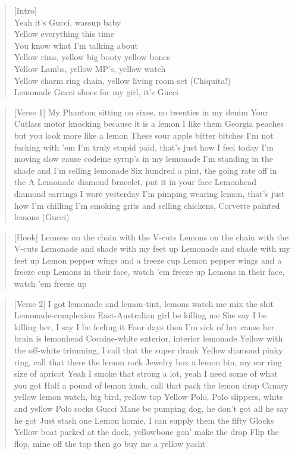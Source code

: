 \documentclass{book}
\begin{document}
\begin{verse}
{[}Intro]\\
Yeah it’s Gucci, wassup baby\\
Yellow everything this time\\
You know what I’m talking about\\
Yellow rims, yellow big booty yellow bones\\
Yellow Lambs, yellow MP's, yellow watch\\
Yellow charm ring chain, yellow living room set (Chiquita!)\\
Lemonade Gucci shoes for my girl, it’s Gucci\\
\end{verse}
\begin{verse}
{[}Verse 1]
My Phantom sitting on sixes, no twenties in my denim
Your Cutlass motor knocking because it is a lemon
I like them Georgia peaches but you look more like a lemon
These sour apple bitter bitches I'm not fucking with 'em
I'm truly stupid paid, that's just how I feel today
I'm moving slow cause codeine syrup's in my lemonade
I'm standing in the shade and I'm selling lemonade
Six hundred a pint, the going rate off in the A
Lemonade diamond bracelet, put it in your face
Lemonhead diamond earrings I wore yesterday
I'm pimping wearing lemon, that's just how I'm chilling
I'm smoking grits and selling chickens, Corvette painted lemons (Gucci)
\end{verse}
\begin{verse}
{[}Hook]
Lemons on the chain with the V-cuts
Lemons on the chain with the V-cuts
Lemonade and shade with my feet up
Lemonade and shade with my feet up
Lemon pepper wings and a freeze cup
Lemon pepper wings and a freeze cup
Lemons in their face, watch 'em freeze up
Lemons in their face, watch 'em freeze up
\end{verse}
\begin{verse}
{[}Verse 2]
I got lemonade and lemon-tint, lemons watch me mix the shit
Lemonade-complexion East-Australian girl be killing me
She say I be killing her, I say I be feeling it
Four days then I'm sick of her cause her brain is lemonhead
Cocaine-white exterior, interior lemonade
Yellow with the off-white trimming, I call that the super drank
Yellow diamond pinky ring, call that there the lemon rock
Jewelry box a lemon bin, my ear ring size of apricot
Yeah I smoke that strong a lot, yeah I need some of what you got
Half a pound of lemon kush, call that pack the lemon drop
Canary yellow lemon watch, big bird, yellow top
Yellow Polo, Polo slippers, white and yellow Polo socks
Gucci Mane be pumping dog, he don't got all he say he got
Just stash one Lemon homie, I can supply them the fifty Glocks
Yellow boat parked at the dock, yellowbone gon' make the drop
Flip the flop, mine off the top then go buy me a yellow yacht
\end{verse}
\end{document}
